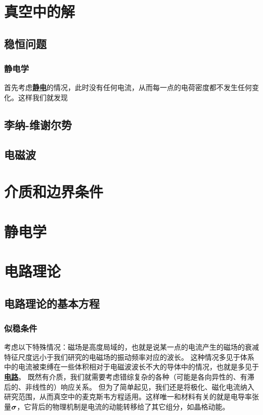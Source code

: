 \documentclass[UTF8, a4paper]{ctexart}
\newcommand*{\concept}[1]{\underline{\textbf{#1}}}
\begin{document}
\section{真空中的解}

\subsection{稳恒问题}

\subsubsection{静电学}

首先考虑\concept{静电}的情况，此时没有任何电流，从而每一点的电荷密度都不发生任何变化。这样我们就发现


\subsection{李纳-维谢尔势}

\subsection{电磁波}

\section{介质和边界条件}

\section{静电学}

\section{电路理论}

\subsection{电路理论的基本方程}

\subsubsection{似稳条件}

考虑以下特殊情况：磁场是高度局域的，也就是说某一点的电流产生的磁场的衰减特征尺度远小于我们研究的电磁场的振动频率对应的波长。
这种情况多见于体系中的电流被束缚在一些体积相对于电磁波波长不大的导体中的情况，也就是多见于\concept{电路}。
既然有介质，我们就需要考虑错综复杂的各种（可能是各向异性的、有滞后的、非线性的）响应关系。
但为了简单起见，我们还是将极化、磁化电流纳入研究范围，从而真空中的麦克斯韦方程适用。这样唯一和材料有关的就是电导率张量$\vb*{\sigma}$，它背后的物理机制是电流的动能转移给了其它组分，如晶格动能。
\end{document}
